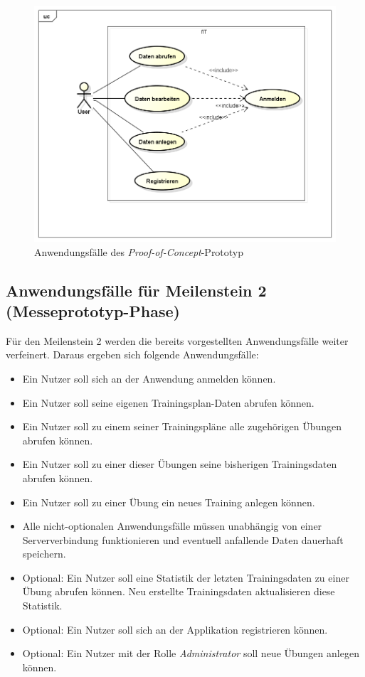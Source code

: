 \begin{figure}[h]
\centering
\includegraphics[width=0.8\linewidth]{content/images/UseCase-Proof-of-Concept.png}
\caption{Anwendungsfälle des \textit{Proof-of-Concept}-Prototyp}
\label{pic:usecase-poc}
\end{figure}

\subsection{Anwendungsfälle für Meilenstein 2 (Messeprototyp-Phase)}
\label{ssec:anwendungsfaelle-messe}
Für den Meilenstein 2 werden die bereits vorgestellten Anwendungsfälle weiter verfeinert. Daraus ergeben sich folgende Anwendungsfälle:
\begin{itemize}
\item Ein Nutzer soll sich an der Anwendung anmelden können.
\item Ein Nutzer soll seine eigenen Trainingsplan-Daten abrufen können.
\item Ein Nutzer soll zu einem seiner Trainingspläne alle zugehörigen Übungen abrufen können.
\item Ein Nutzer soll zu einer dieser Übungen seine bisherigen Trainingsdaten abrufen können.
\item Ein Nutzer soll zu einer Übung ein neues Training anlegen können.
\item Alle nicht-optionalen Anwendungsfälle müssen unabhängig von einer Serververbindung funktionieren und eventuell anfallende Daten dauerhaft speichern.
\item Optional: Ein Nutzer soll eine Statistik der letzten Trainingsdaten zu einer Übung abrufen können. Neu erstellte Trainingsdaten aktualisieren diese Statistik.
\item Optional: Ein Nutzer soll sich an der Applikation registrieren können.
\item Optional: Ein Nutzer mit der Rolle \textit{Administrator} soll neue Übungen anlegen können.
\end{itemize}

